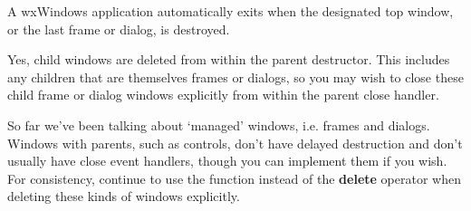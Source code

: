 
A wxWindows application automatically exits when the designated top window, or the
last frame or dialog, is destroyed.


Yes, child windows are deleted from within the parent destructor. This includes any children
that are themselves frames or dialogs, so you may wish to close these child frame or dialog windows
explicitly from within the parent close handler.


So far we've been talking about `managed' windows, i.e. frames and dialogs. Windows
with parents, such as controls, don't have delayed destruction and don't usually have
close event handlers, though you can implement them if you wish. For consistency,
continue to use the  function instead
of the {\bf delete} operator when deleting these kinds of windows explicitly.

